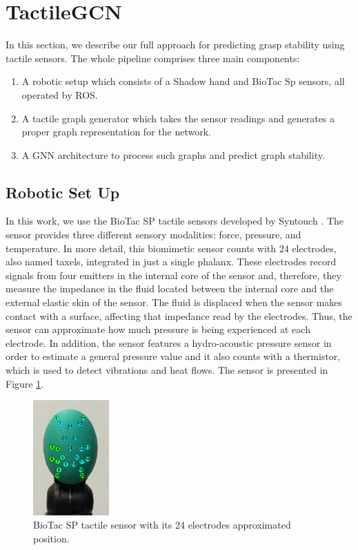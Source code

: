 \section{TactileGCN}
\label{cha:tactile:sec:tactilegcn}

In this section, we describe our full approach for predicting grasp stability using tactile sensors. The whole pipeline comprises three main components:

\begin{enumerate}
    \item A robotic setup which consists of a Shadow hand and BioTac Sp sensors, all operated by \ac{ROS}.
    \item A tactile graph generator which takes the sensor readings and generates a proper graph representation for the network.
    \item A \ac{GNN} architecture to process such graphs and predict graph stability.
\end{enumerate}

\subsection{Robotic Set Up}
\label{cha:tactile:sec:tactilegcn:subsec:rpobotic-set-up}

In this work, we use the BioTac SP tactile sensors developed by Syntouch \cite{Syntouch2018}. The sensor provides three different sensory modalities: force, pressure, and temperature. In more detail, this biomimetic sensor counts with $24$ electrodes, also named taxels, integrated in just a single phalanx. These electrodes record signals from four emitters in the internal core of the sensor and, therefore, they measure the impedance in the fluid located between the internal core and the external elastic skin of the sensor. The fluid is displaced when the sensor makes contact with a surface, affecting that impedance read by the electrodes. Thus, the sensor can approximate how much pressure is being experienced at each electrode. In addition, the sensor features a hydro-acoustic pressure sensor in order to estimate a general pressure value and it also counts with a thermistor, which is used to detect vibrations and heat flows. The sensor is presented in Figure \ref{fig:biotac-sensor}.

\begin{figure}[!htb]
	\centering
	\includegraphics[width = 0.26\textwidth, clip = true, trim = 0 75 0 20]{Figures/Tactile/biotac-sensor.png}
	\caption{BioTac SP tactile sensor with its 24 electrodes approximated position.}
	\label{fig:biotac-sensor}
\end{figure}

